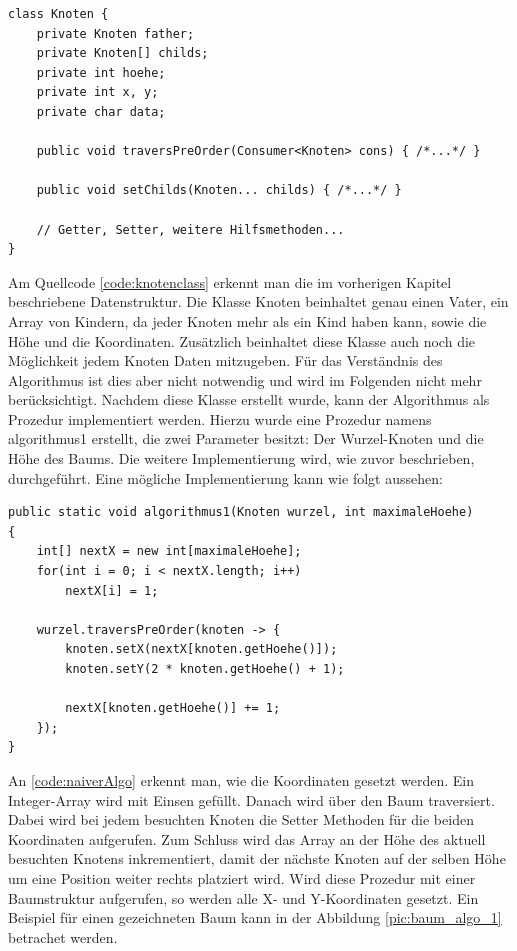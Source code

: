 \begin{lstlisting}[caption=Vereinfachte Implementierung der Knotenklasse, label=code:knotenclass]
class Knoten {
	private Knoten father;
	private Knoten[] childs;
	private int hoehe;
	private int x, y;
	private char data;

	public void traversPreOrder(Consumer<Knoten> cons) { /*...*/ }

	public void setChilds(Knoten... childs) { /*...*/ }

	// Getter, Setter, weitere Hilfsmethoden...
}
\end{lstlisting}
Am Quellcode \ref{code:knotenclass} erkennt man die im vorherigen Kapitel beschriebene Datenstruktur. Die Klasse Knoten beinhaltet genau einen
Vater, ein Array von Kindern, da jeder Knoten mehr als ein Kind haben kann, sowie die Höhe und die Koordinaten. Zusätzlich beinhaltet diese 
Klasse auch noch die Möglichkeit jedem Knoten Daten mitzugeben. Für das Verständnis des Algorithmus ist dies aber nicht notwendig und wird
im Folgenden nicht mehr berücksichtigt. Nachdem diese Klasse erstellt wurde, kann der Algorithmus als Prozedur implementiert werden.
Hierzu wurde eine Prozedur namens \glqq algorithmus1\grqq{} erstellt, die zwei Parameter besitzt: Der Wurzel-Knoten
und die Höhe des Baums. Die weitere Implementierung wird, wie zuvor beschrieben, durchgeführt. Eine mögliche Implementierung
kann wie folgt aussehen:

\begin{lstlisting}[caption=Implementierung des naiven Algorithmus, label=code:naiverAlgo]
public static void algorithmus1(Knoten wurzel, int maximaleHoehe) 
{
	int[] nextX = new int[maximaleHoehe];
	for(int i = 0; i < nextX.length; i++)
		nextX[i] = 1;
	
	wurzel.traversPreOrder(knoten -> {
		knoten.setX(nextX[knoten.getHoehe()]);
		knoten.setY(2 * knoten.getHoehe() + 1);
		
		nextX[knoten.getHoehe()] += 1;
	});
}
\end{lstlisting}
An \ref{code:naiverAlgo} erkennt man, wie die Koordinaten gesetzt werden. Ein Integer-Array wird mit Einsen gefüllt. Danach wird über den Baum
traversiert. Dabei wird bei jedem besuchten Knoten die Setter Methoden für die beiden Koordinaten aufgerufen. Zum Schluss wird das Array an der 
Höhe des aktuell besuchten Knotens inkrementiert, damit der nächste Knoten auf der selben Höhe um eine Position weiter rechts platziert wird.
Wird diese Prozedur mit einer Baumstruktur aufgerufen, so werden alle X- und Y-Koordinaten gesetzt.
Ein Beispiel für einen gezeichneten Baum kann in der Abbildung \ref{pic:baum_algo_1} betrachet werden.

